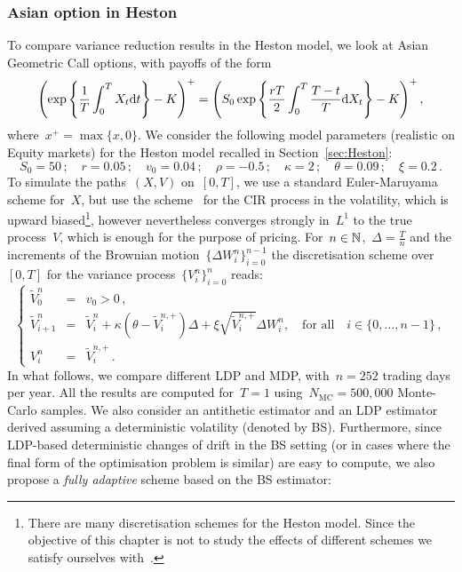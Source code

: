 \subsubsection{Asian option in Heston}
To compare variance reduction results in the Heston model, we look at Asian Geometric Call options, with payoffs of the form
\[
\left(\exp\left\{\frac{1}{T}\int_0^T X_t\mathrm{d} t\right\} - K\right)^+ = \left(S_0 \exp\left \{\frac{rT}{2}\int_0^T\frac{T-t}{T}\mathrm{d} X_t\right \} - K\right)^+,
\]
where~$x^+ = \max\{x,0\}$. 
We consider the following model parameters 
(realistic on Equity markets)
for the Heston model recalled in Section~\ref{sec:Heston}:
$$
S_0 = 50\,; \quad
r = 0.05\,; \quad
v_0 = 0.04\,; \quad
\rho = -0.5\,; \quad 
\kappa = 2\,; \quad
\theta = 0.09\,; \quad 
\xi = 0.2\,.
$$
To simulate the paths~$(X,V)$ on~$[0,T]$, 
we use a standard Euler-Maruyama scheme for~$X$, but use the scheme~\cite{Lord2009AModels} for the CIR process in the volatility, 
which is upward biased\footnote{There are many discretisation schemes for the Heston model. 
Since the objective of this chapter is not to study the effects of different schemes we satisfy ourselves with~\cite{Lord2009AModels}.}, however nevertheless converges strongly in~$L^1$ to the true process~$V$, which is enough for the purpose of pricing. For~$n\in\mathbb{N}$,~$\Delta =\frac{T}{n}$ and the increments of the Brownian motion~$\{\Delta W_{i}^n\}_{i=0}^{n-1}$ the discretisation scheme over~$[0,T]$ for the variance process~$\{V_i^n\}_{i=0}^n$ reads:
\begin{equation*}
\left\{
\begin{array}{rcl}
\widetilde{V}_{0}^n & = & v_0>0\,, \\
\widetilde{V}_{i+1}^n & = & \widetilde{V}_{i}^n + \kappa \left(\theta - \widetilde{V}_{i}^{n,+}\right)\Delta + \xi \sqrt{\widetilde{V}_{i}^{n,+}}\Delta W_{i}^n, \quad \text{for all} \quad i\in\{0,\dots,n-1\}\,, \\
V_{i}^n & = & \widetilde{V}_{i}^{n,+}\,.
\end{array}
\right.
\end{equation*}
In what follows, we compare different LDP and MDP, with~$n=252$ trading days per year. 
All the results are computed for~$T=1$ using~$N_{\text{MC}}=500,000$ Monte-Carlo samples. 
We also consider an antithetic estimator and an LDP estimator derived assuming a deterministic volatility (denoted by BS).
Furthermore, since LDP-based deterministic changes of drift in the BS setting (or in cases where the final form of the optimisation problem is similar) are easy to compute, we also propose a \textit{fully adaptive} scheme based on the BS estimator: 

